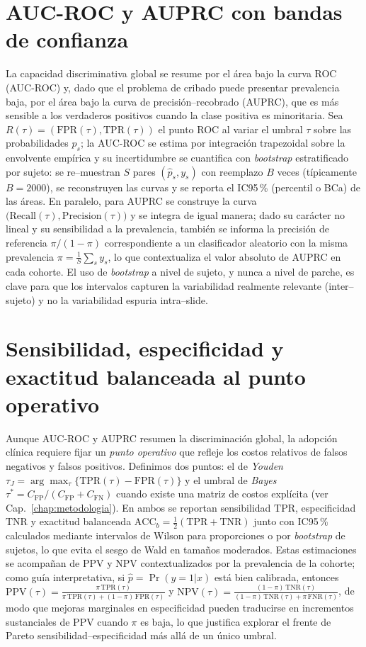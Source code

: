 \section*{AUC-ROC y AUPRC con bandas de confianza}
La capacidad discriminativa global se resume por el área bajo la curva ROC (AUC-ROC) y, dado que el problema de cribado puede presentar prevalencia baja, por el área bajo la curva de precisión–recobrado (AUPRC), que es más sensible a los verdaderos positivos cuando la clase positiva es minoritaria. Sea $R(\tau)=(\mathrm{FPR}(\tau),\mathrm{TPR}(\tau))$ el punto ROC al variar el umbral $\tau$ sobre las probabilidades $\hat{p}_s$; la AUC-ROC se estima por integración trapezoidal sobre la envolvente empírica y su incertidumbre se cuantifica con \emph{bootstrap} estratificado por sujeto: se re–muestran $S$ pares $(\hat{p}_s,y_s)$ con reemplazo $B$ veces (típicamente $B=2000$), se reconstruyen las curvas y se reporta el IC95\,\% (percentil o BCa) de las áreas. En paralelo, para AUPRC se construye la curva $\big(\mathrm{Recall}(\tau),\mathrm{Precision}(\tau)\big)$ y se integra de igual manera; dado su carácter no lineal y su sensibilidad a la prevalencia, también se informa la precisión de referencia $\pi/(1-\pi)$ correspondiente a un clasificador aleatorio con la misma prevalencia $\pi=\frac{1}{S}\sum_s y_s$, lo que contextualiza el valor absoluto de AUPRC en cada cohorte. El uso de \emph{bootstrap} a nivel de sujeto, y nunca a nivel de parche, es clave para que los intervalos capturen la variabilidad realmente relevante (inter–sujeto) y no la variabilidad espuria intra–slide.

\section*{Sensibilidad, especificidad y exactitud balanceada al punto operativo}
Aunque AUC-ROC y AUPRC resumen la discriminación global, la adopción clínica requiere fijar un \emph{punto operativo} que refleje los costos relativos de falsos negativos y falsos positivos. Definimos dos puntos: el de \emph{Youden} $\tau_J=\arg\max_\tau\{\mathrm{TPR}(\tau)-\mathrm{FPR}(\tau)\}$ y el umbral de \emph{Bayes} $\tau^\ast=C_{\mathrm{FP}}/(C_{\mathrm{FP}}+C_{\mathrm{FN}})$ cuando existe una matriz de costos explícita (ver Cap.~\ref{chap:metodologia}). En ambos se reportan sensibilidad $\mathrm{TPR}$, especificidad $\mathrm{TNR}$ y exactitud balanceada $\mathrm{ACC}_b=\tfrac{1}{2}(\mathrm{TPR}+\mathrm{TNR})$ junto con IC95\,\% calculados mediante intervalos de Wilson para proporciones o por \emph{bootstrap} de sujetos, lo que evita el sesgo de Wald en tamaños moderados. Estas estimaciones se acompañan de PPV y NPV contextualizados por la prevalencia de la cohorte; como guía interpretativa, si $\hat{p}=\Pr(y{=}1|x)$ está bien calibrada, entonces $\mathrm{PPV}(\tau)=\frac{\pi\,\mathrm{TPR}(\tau)}{\pi\,\mathrm{TPR}(\tau)+(1-\pi)\,\mathrm{FPR}(\tau)}$ y $\mathrm{NPV}(\tau)=\frac{(1-\pi)\,\mathrm{TNR}(\tau)}{(1-\pi)\,\mathrm{TNR}(\tau)+\pi\,\mathrm{FNR}(\tau)}$, de modo que mejoras marginales en especificidad pueden traducirse en incrementos sustanciales de PPV cuando $\pi$ es baja, lo que justifica explorar el frente de Pareto sensibilidad–especificidad más allá de un único umbral.

